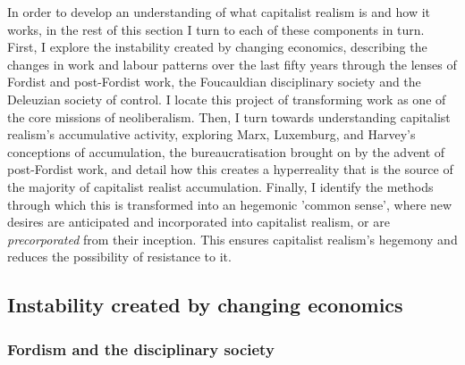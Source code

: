 In order to develop an understanding of what capitalist realism is and how it works, in the rest of this section I turn to each of these components in turn. First, I explore the instability created by changing economics, describing the changes in work and labour patterns over the last fifty years through the lenses of Fordist and post-Fordist work, the Foucauldian disciplinary society and the Deleuzian society of control. I locate this project of transforming work as one of the core missions of neoliberalism. Then, I turn towards understanding capitalist realism's accumulative activity, exploring Marx, Luxemburg, and Harvey's conceptions of accumulation, the bureaucratisation brought on by the advent of post-Fordist work, and detail how this creates a hyperreality that is the source of the majority of capitalist realist accumulation. Finally, I identify the methods through which this is transformed into an hegemonic 'common sense', where new desires are anticipated and incorporated into capitalist realism, or are \emph{precorporated} from their inception. This ensures capitalist realism's hegemony and reduces the possibility of resistance to it.

\subsection{Instability created by changing economics}
\label{2-instability}

\subsubsection{Fordism and the disciplinary society}
\label{fordism-and-the-disciplinary-society}

